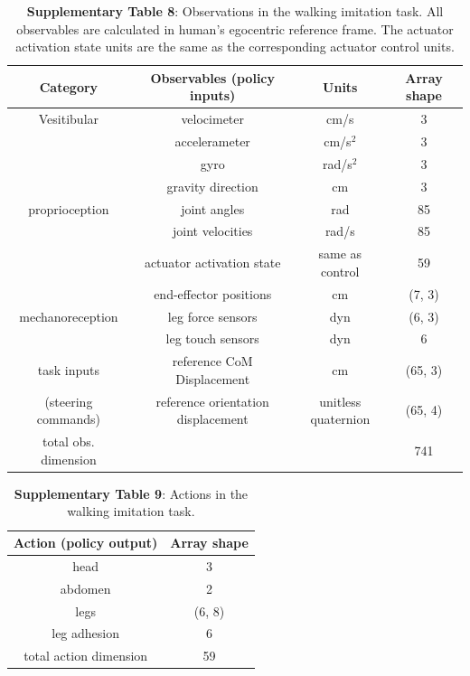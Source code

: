 \documentclass[sn-mathphys-num]{sn-jnl}%
\theoremstyle{thmstyleone}	%
\theoremstyle{thmstyletwo}	%
\theoremstyle{thmstylethree}	%
\begin{document}
\begin{appendices}
\begin{table}[htbp]
	\centering
	\small
	\caption{\textbf{Supplementary Table 8}: 
		Observations in the walking imitation task. 
		All observables are calculated in human's egocentric reference frame.
		The actuator activation state units are the same as the corresponding actuator control units.}
	\begin{tabular}{cccc}
		\toprule
		Category         &        Observables (policy inputs)  & Units  & Array shape  \\
		\midrule
		Vesitibular     &  velocimeter      &   cm/s & 3  \\
		&  accelerameter      &   cm/s$ ^2 $ & 3  \\
		&  gyro      &   rad/s$ ^2 $ & 3  \\
		&  gravity direction      &   cm & 3  \\
		\midrule
		proprioception     &  joint angles      &   rad & 85  \\
		&  joint velocities      &   rad/s & 85  \\
		&  actuator activation state      &   same as control & 59  \\
		&  end-effector positions      &   cm & (7, 3)  \\
		\midrule
		mechanoreception     &  leg force sensors      &   dyn & (6, 3)  \\
		     &  leg touch sensors      &   dyn & 6  \\
		\midrule
		task inputs     &  reference CoM Displacement      &   cm & (65, 3)  \\
		(steering commands)     &  reference orientation displacement      &   \makecell{unitless \\quaternion} & (65, 4)  \\
		\midrule
		total obs. dimension     &        &    & 741  \\
		\bottomrule
	\end{tabular}%
	\label{tab:s_8}%
\end{table}%


\begin{table}[htbp]
	\centering
	\small
	\caption{\textbf{Supplementary Table 9}: 
		Actions in the walking imitation task.
	}
	\begin{tabular}{cc}
		\toprule
		\textbf{Action (policy output)}         &        \textbf{Array shape}    \\
		\midrule
		head     &  3        \\
		abdomen     &  2        \\
		legs     &  (6, 8)        \\
		leg adhesion     &  6        \\
		\midrule
		total action dimension     &  59        \\
		\bottomrule
	\end{tabular}%
	\label{tab:s_9}%
\end{table}%




\end{appendices}
\end{document}

